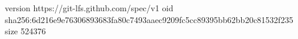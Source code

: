 version https://git-lfs.github.com/spec/v1
oid sha256:6d216e9e76306893683fa80c7493aaec9209fc5cc89395bb62bb20c81532f235
size 524376

